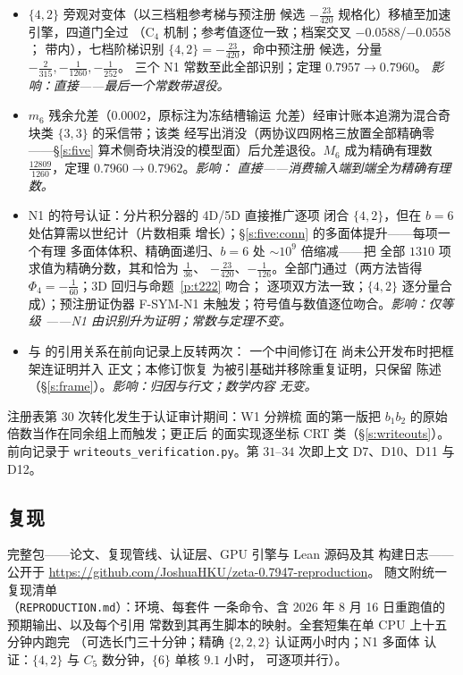 \documentclass[11pt]{article}
\numberwithin{equation}{section}
\theoremstyle{definition}
\theoremstyle{remark}
\begin{document}
\begin{itemize}
$C_5=\tfrac1{36}$、$\{6\}=-\tfrac1{126}$（及弱一档的
$C_7=-\tfrac{17}{360}$），全部落在原误差带内。论文常数
$0.0278(1)\to\tfrac1{36}$、$-0.0078(8)\to-\tfrac1{126}$，
定理 $0.7947\to0.7957$。\emph{影响：直接——被消费三常数中
两个的误差带塌缩十一个数量级。}
\item[D16.] $\{4,2\}$ 旁观对变体（以三档粗参考梯与预注册
候选 $-\tfrac{23}{420}$ 规格化）移植至加速引擎，四道门全过
（C$_4$ 机制；参考值逐位一致；档案交叉 $-0.0588$/$-0.0558$；
带内），七档阶梯识别 $\{4,2\}=-\tfrac{23}{420}$，命中预注册
候选，分量 $-\tfrac2{315},-\tfrac1{1260},-\tfrac1{252}$。
三个 N1 常数至此全部识别；定理 $0.7957\to0.7960$。
\emph{影响：直接——最后一个常数带退役。}
\item[D17.] $m_6$ 残余允差（$0.0002$，原标注为冻结槽输运
允差）经审计账本追溯为混合奇块类 $\{3,3\}$ 的采信带；该类
经写出消没（两协议四网格三放置全部精确零——\S\ref{s:five}
算术侧奇块消没的模型面）后允差退役。$M_6$ 成为精确有理数
$\tfrac{12809}{1260}$，定理 $0.7960\to0.7962$。\emph{影响：
直接——消费输入端到端全为精确有理数。}
\item[D18.] N1 的符号认证：分片积分器的 4D/5D 直接推广逐项
闭合 $\{4,2\}$，但在 $b=6$ 处估算需以世纪计（片数相乘
增长）；\S\ref{s:five:conn} 的多面体提升——每项一个有理
多面体体积、精确面递归、$b=6$ 处 $\sim10^{9}$ 倍缩减——把
全部 $1310$ 项求值为精确分数，其和恰为 $\tfrac1{36}$、
$-\tfrac{23}{420}$、$-\tfrac1{126}$。全部门通过（两方法皆得
$\Phi_4=-\tfrac1{60}$；3D 回归与命题~\ref{p:t222} 吻合；
逐项双方法一致；$\{4,2\}$ 逐分量合成）；预注册证伪器
F-SYM-N1 未触发；符号值与数值逐位吻合。\emph{影响：仅等级
——N1 由识别升为证明；常数与定理不变。}
\item[D13.] 与 \cite{C26} 的引用关系在前向记录上反转两次：
一个中间修订在 \cite{C26} 尚未公开发布时把框架连证明并入
正文；本修订恢复 \cite{C26} 为被引基础并移除重复证明，只保留
陈述（\S\ref{s:frame}）。\emph{影响：归因与行文；数学内容
无变。}
\end{itemize}

\noindent 注册表第 $30$ 次转化发生于认证审计期间：W1 分辨梳
面的第一版把 $b_1b_2$ 的原始倍数当作在同余组上而触发；更正后
的面实现逐坐标 CRT 类（\S\ref{s:writeouts}）。前向记录于
\texttt{writeouts\_verification.py}。第 $31$--$34$ 次即上文
D7、D10、D11 与 D12。

\subsection*{复现}

完整包——论文、复现管线、认证层、GPU 引擎与 Lean 源码及其
构建日志——公开于
\url{https://github.com/JoshuaHKU/zeta-0.7947-reproduction}。
随文附统一复现清单 \\（\texttt{REPRODUCTION.md}）：环境、每套件
一条命令、含 2026 年 8 月 16 日重跑值的预期输出、以及每个引用
常数到其再生脚本的映射。全套短集在单 CPU 上十五分钟内跑完
（可选长门三十分钟；精确 $\{2,2,2\}$ 认证两小时内；N1 多面体
认证：$\{4,2\}$ 与 $C_5$ 数分钟，$\{6\}$ 单核 $9.1$ 小时，
可逐项并行）。
\end{document}
